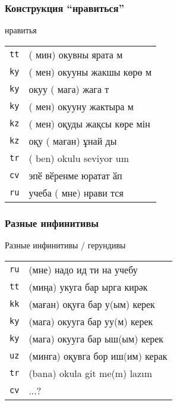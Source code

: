 \documentclass[10pt,xetex]{beamer} %
\begin{document}
\begin{frame}
	\frametitle{Конструкция ``нравиться''}
	\begin{block}{нравитья}
	\begin{tabular}{ll}
		\texttt{tt} & ({\color{green} мин}) {\color{blue} окув}ны {\color{red} ярат}а{\color{green} м} \\
		\texttt{ky} & ({\color{green} мен}) {\color{blue} окуу}ны {\color{red} жакшы көр}ө{\color{green} м} \\
		\texttt{ky} & {\color{blue} окуу} ({\color{green} мага}) {\color{red} жаг}а{\color{blue} т} \\
		\texttt{ky} & ({\color{green} мен}) {\color{blue} окуу}ну {\color{red} жактыр}{а\color{green} м} \\
		\texttt{kz} & ({\color{green} мен}) {\color{blue} оқу}ды {\color{red} жақсы көр}е{\color{green} мін} \\
		\texttt{kz} & {\color{blue} оқу} ({\color{green} маған}) {\color{red} ұна}й{\color{blue} ды} \\
		\texttt{tr} & ({\color{green} ben}) {\color{blue} okul}u {\color{red} sev}iyor{\color{green} um} \\
		\texttt{cv} & {\color{green} эпӗ} {\color{blue} вӗренме} {\color{red} юрат}ат{\color{green} ӑп} \\
		\texttt{ru} &  {\color{blue} учеба} ({\color{green} мне}) {\color{red} нрави}{\color{blue} т}ся
	\end{tabular}
	\end{block}
\end{frame}

\begin{frame}
	\frametitle{Разные инфинитивы}
	\begin{block}{Разные инфинитивы / герундивы}
		\begin{tabular}{ll}
			\texttt{ru} & (мне) {\color{red} надо} ид{\color{blue} ти} на учебу \\
			\texttt{tt} & (миңа) укуга бар{\color{blue} ырга} {\color{red} кирәк} \\
			\texttt{kk} & (маған) оқуға бар{\color{blue} у}(ым) {\color{red} керек} \\
			\texttt{ky} & (мага) окууга бар{\color{blue} уу}(м) {\color{red} керек} \\
			\texttt{ky} & (мага) окууга бар{\color{blue} ыш}(ым) {\color{red} керек} \\
			\texttt{uz} & (минга) оқувга бор{\color{blue} иш}(им) {\color{red} керак} \\
			\texttt{tr} & (bana) okula git{\color{blue} me}(m) {\color{red} lazım} \\
			\texttt{cv} & ...?
		\end{tabular}
	\end{block}

\end{frame}
\end{document}
